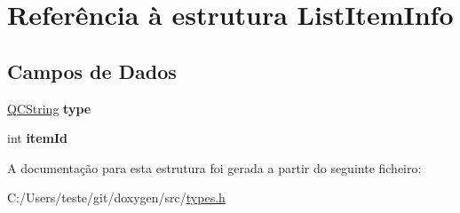 \hypertarget{struct_list_item_info}{\section{Referência à estrutura List\-Item\-Info}
\label{struct_list_item_info}
}
\subsection*{Campos de Dados}
\begin{DoxyCompactItemize}
\item 
\hypertarget{struct_list_item_info_a0d4463771e24026060ae68b04822d7af}{\hyperlink{class_q_c_string}{Q\-C\-String} {\bfseries type}}\label{struct_list_item_info_a0d4463771e24026060ae68b04822d7af}

\item 
\hypertarget{struct_list_item_info_a1621aecf4ccdef66f01ede205a5e804b}{int {\bfseries item\-Id}}\label{struct_list_item_info_a1621aecf4ccdef66f01ede205a5e804b}

\end{DoxyCompactItemize}


A documentação para esta estrutura foi gerada a partir do seguinte ficheiro\-:\begin{DoxyCompactItemize}
\item 
C\-:/\-Users/teste/git/doxygen/src/\hyperlink{types_8h}{types.\-h}\end{DoxyCompactItemize}
